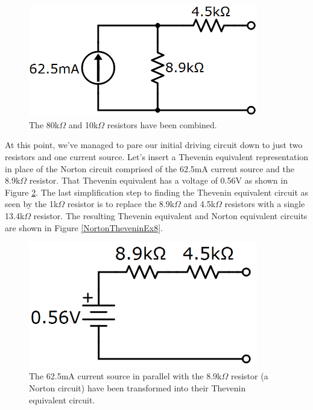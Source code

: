 \begin{figure}[h!]
\centering
\includegraphics[width=10cm]{figures/nortThevEx_6.png}
\caption{The 80k$\Omega$ and 10k$\Omega$ resistors have been combined.}
\label{NortonTheveninEx6}
\end{figure}
\par
At this point, we've managed to pare our initial driving circuit down to just two resistors and one current source. Let's insert a Thevenin equivalent representation in place of the Norton circuit comprised of the 62.5mA current source and the 8.9k$\Omega$ resistor. That Thevenin equivalent has a voltage of 0.56V as shown in Figure \ref{NortonTheveninEx7}. The last simplification step to finding the Thevenin equivalent circuit as seen by the 1k$\Omega$ resistor is to replace the 8.9k$\Omega$ and 4.5k$\Omega$ resistors with a single 13.4k$\Omega$ resistor. The resulting Thevenin equivalent and Norton equivalent circuits are shown in Figure \ref{NortonTheveninEx8}.
\begin{figure}[h!]
\centering
\includegraphics[width=10cm]{figures/nortThevEx_7.png}
\caption{The 62.5mA current source in parallel with the 8.9k$\Omega$ resistor (a Norton circuit) have been transformed into their Thevenin equivalent circuit.}
\label{NortonTheveninEx7}
\end{figure}

